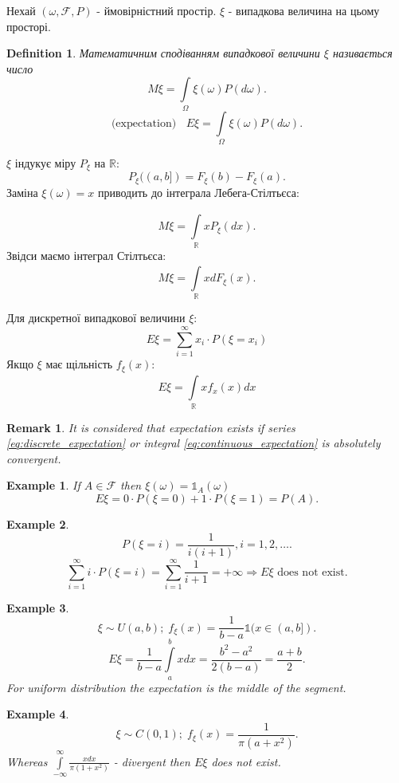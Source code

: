 \documentclass[12pt,letterpaper]{report}
\newtheorem*{example}{Example}
\newtheorem*{remark}{Remark}
\newtheorem{definition}{Definition}
\begin{document}
Нехай $(\omega, \mathcal{F}, P)$ - ймовірністний простір. $\xi$ - випадкова величина на цьому просторі.

\begin{definition}
    Математичним сподіванням випадкової величини $\xi$ називається число
    \[
        M\xi = \int\limits_{\Omega} \xi(\omega) P(d\omega)
    .\] 
    \[
        \text{(expectation) } \;\; E \xi = \int\limits_{\Omega} \xi(\omega) P(d\omega)
    .\] 
\end{definition}

$\xi$ індукує міру $P_{\xi}$ на $\mathbb{R}$:
\[
    P_{\xi} ((a,b]) = F_{\xi}(b) - F_{\xi}(a)
.\] 
Заміна $\xi(\omega) = x$ приводить до інтеграла Лебега-Стілтьєса:

\[
    M\xi = \int\limits_{\mathbb{R}}^{} x P_{\xi}(dx)
.\]
Звідси маємо інтеграл Стілтьєса: 
\[
    M\xi = \int\limits_{\mathbb{R}}^{} x dF_{\xi}(x)
.\] 

Для дискретної випадкової величини $\xi$:
\begin{equation} \label{eq:discrete_expectation}
    E\xi = \sum_{i=1}^{\infty} x_{i} \cdot P(\xi = x_i)
\end{equation}
Якщо $\xi$ має щільність $f_{\xi}(x)$:
\begin{equation} \label{eq:continuous_expectation}
    E\xi = \int\limits_{\mathbb{R}}^{}x f_{x} (x) dx
\end{equation}

\begin{remark}
    It is considered that expectation exists if series \eqref{eq:discrete_expectation} or integral \eqref{eq:continuous_expectation} is absolutely convergent.
\end{remark}

\begin{example}
    If $A \in \mathcal{F} $ then $\xi(\omega) = \mathds{1}_{A}(\omega)$
\[
    E\xi = 0 \cdot P(\xi=0) + 1 \cdot P(\xi=1) = P(A)
.\] 
\end{example}
\begin{example}
    \[
        P(\xi = i) = \frac{1}{i (i+1)}, i=1, 2, \dots
    .\] 
    \[
        \sum_{i=1}^{\infty} i \cdot P(\xi=i) = \sum_{i=1}^{\infty} \frac{1}{i+1} = +\infty \Rightarrow
        E\xi \text{ does not exist}
    .\] 
\end{example}

\begin{example}
   \[
       \xi \sim U(a, b); \; f_{\xi}(x) = \frac{1}{b-a} \mathds{1}(x\in(a,b])
   .\] 
   \[
       E\xi = \frac{1}{b-a} \int\limits_{a}^{b}x dx = \frac{b^2 - a^2}{2(b-a)} = \frac{a+b}{2}
   .\] 
   For uniform distribution the expectation is the middle of the segment.
\end{example}
\begin{example}
    \[
        \xi \sim C(0,1); \; f_{\xi}(x) = \frac{1}{\pi (a+x^2)}
    .\] 
    Whereas $\int\limits_{-\infty}^{\infty}\frac{xdx}{\pi (1+x^2)}$ - divergent then $E\xi$ does not exist.
\end{example}
\end{document}

